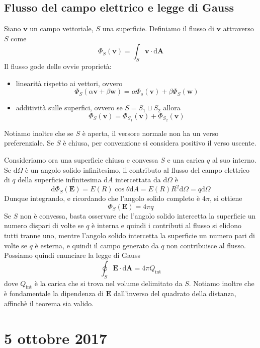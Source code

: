 \documentclass[a4paper,11pt]{book}
\newcommand{\dif}{\mathrm{d}}
\renewcommand{\vec}[1]{\mathbf{#1}}
\theoremstyle{theorem}
\theoremstyle{definition}
\begin{document}
\subsection{Flusso del campo elettrico e legge di Gauss}
Siano $\vec{v}$ un campo vettoriale, $S$ una superficie. Definiamo il flusso di $\vec{v}$ attraverso $S$ come
\[\Phi_S(\vec{v})=\int_S\vec{v}\cdot\dif\vec{A}\]
Il flusso gode delle ovvie proprietà:
\begin{itemize}
	\item linearità rispetto ai vettori, ovvero \[\Phi_S(\alpha\vec{v}+\beta\vec{w})=\alpha\Phi_s(\vec{v})+\beta\Phi_S(\vec{w})\]
	\item additività sulle superfici, ovvero se $S=S_1\sqcup S_2$ allora
	\[
		\Phi_S(\vec{v})=\Phi_{S_1}(\vec{v})+\Phi_{S_2}(\vec{v})
	\]
\end{itemize}
Notiamo inoltre che se $S$ è aperta, il versore normale non ha un verso preferenziale. Se $S$ è chiusa, per convenzione si considera positivo il verso uscente.

Consideriamo ora una superficie chiusa e convessa $S$ e una carica $q$ al suo interno. Se $\dif\Omega$ è un angolo solido infinitesimo, il contributo al flusso del campo elettrico di $q$ della superficie infinitesima $\dif A$ intercettata da $\dif\Omega$ è
\[
	\dif\Phi_S(\vec{E})=E(R)\cos\theta\dif A=E(R)R^2\dif\Omega=q\dif\Omega
\]
Dunque integrando, e ricordando che l'angolo solido completo è $4\pi$, si ottiene
\[\Phi_S(\vec{E})=4\pi q\]
Se $S$ non è convessa, basta osservare che l'angolo solido intercetta la superficie un numero dispari di volte se $q$ è interna e quindi i contributi al flusso si elidono tutti tranne uno, mentre l'angolo solido intercetta la superficie un numero pari di volte se $q$ è esterna, e quindi il campo generato da $q$ non contribuisce al flusso. Possiamo quindi enunciare la legge di Gauss
\begin{equation}
\label{integralgauss}
	\oint_S\vec{E}\cdot\dif\vec{A}=4\pi Q_{\textrm{int}}
\end{equation}
dove $Q_{\textrm{int}}$ è la carica che si trova nel volume delimitato da $S$. Notiamo inoltre che è fondamentale la dipendenza di $\vec{E}$ dall'inverso del quadrato della distanza, affinchè il teorema sia valido.
\newpage
\section{5 ottobre 2017}
\end{document}
